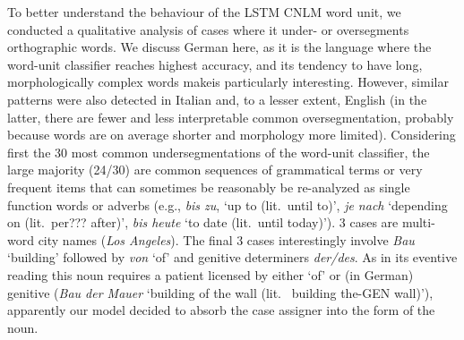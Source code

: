 To better understand the behaviour of the LSTM CNLM word unit, we
conducted a qualitative analysis of cases where it under- or
oversegments orthographic words. We discuss German here, as it is the
language where the word-unit classifier reaches highest accuracy, and
its tendency to have long, morphologically complex words makeis
particularly interesting. However, similar patterns were also detected
in Italian and, to a lesser extent, English (in the latter, there are
fewer and less interpretable common oversegmentation, probably because
words are on average shorter and morphology more limited). Considering
first the 30 most common undersegmentations of the word-unit
classifier, the large majority (24/30) are common sequences of
grammatical terms or very frequent items that can sometimes be
reasonably be re-analyzed as single function words or adverbs (e.g.,
\emph{bis zu}, `up to (lit.~until to)', \emph{je nach} `depending on
(lit.~per??? after)', \emph{bis heute} `to date (lit.~until
today)'). 3 cases are multi-word city names (\emph{Los Angeles}). The
final 3 cases interestingly involve \emph{Bau} `building' followed by
\emph{von} `of' and genitive determiners \emph{der/des}. As in its
eventive reading this noun requires a patient licensed by either `of'
or (in German) genitive (\emph{Bau der Mauer} `building of the wall
(lit.~ building the-GEN wall)'), apparently our model decided to
absorb the case assigner into the form of the noun.










